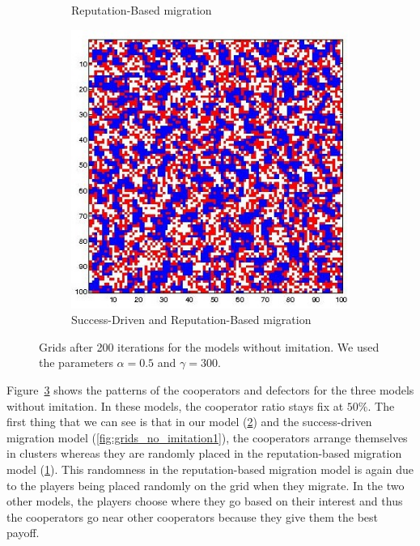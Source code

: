 \documentclass[11pt]{article}
\begin{document}
\begin{figure}[H]
\begin{subfigure}[t]{0.3\textwidth}
	\caption{Reputation-Based migration}
	\label{fig:grids_no_imitation4}
    	\end{subfigure}
	\begin{subfigure}[t]{0.3\textwidth}
        \includegraphics[width=\textwidth]{../../other/grids/m5-t200-a5-g300.jpg}
	\caption{Success-Driven and Reputation-Based migration}
	\label{fig:grids_no_imitation5}
    	\end{subfigure}

	\caption{Grids after 200 iterations for the models without imitation. We used the parameters $\alpha = 0.5$ and $\gamma = 300$.}
	\label{fig:grids_no_imitation}
\end{figure}

Figure~\ref{fig:grids_no_imitation} shows the patterns of the cooperators and defectors for the three models without imitation. In these models, the cooperator ratio stays fix at $50\%$. The first thing that we can see is that in our model (\ref{fig:grids_no_imitation5}) and the success-driven migration model (\ref{fig:grids_no_imitation1}), the cooperators arrange themselves in clusters whereas they are randomly placed in the reputation-based migration model (\ref{fig:grids_no_imitation4}).
This randomness in the reputation-based migration model is again due to the players being placed randomly on the grid when they migrate.
In the two other models, the players choose where they go based on their interest and thus the cooperators go near other cooperators because they give them the best payoff.
\end{document}
